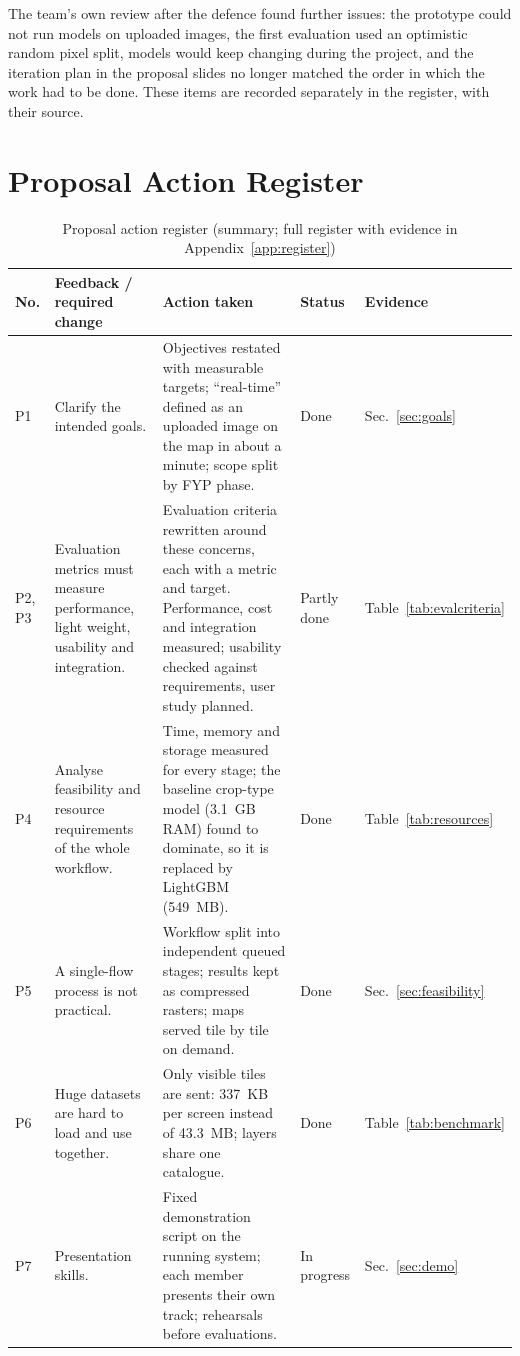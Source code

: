 The team's own review after the defence found further issues: the prototype could not run models on
uploaded images, the first evaluation used an optimistic random pixel split, models would keep
changing during the project, and the iteration plan in the proposal slides no longer matched the
order in which the work had to be done. These items are recorded separately in the register, with
their source.

\section{Proposal Action Register}
\begin{table}[htbp]
\centering\small
\caption{Proposal action register (summary; full register with evidence in Appendix~\ref{app:register})}
\label{tab:register}
\begin{tabularx}{\textwidth}{L{0.8cm} L{3.6cm} Y L{1.3cm} L{1.7cm}}
\toprule
\textbf{No.} & \textbf{Feedback / required change} & \textbf{Action taken} & \textbf{Status} & \textbf{Evidence}\\
\midrule
P1 & Clarify the intended goals. & Objectives restated with measurable targets; ``real-time'' defined as an uploaded image on the map in about a minute; scope split by FYP phase. & Done & Sec.~\ref{sec:goals}\\
P2, P3 & Evaluation metrics must measure performance, light weight, usability and integration. & Evaluation criteria rewritten around these concerns, each with a metric and target. Performance, cost and integration measured; usability checked against requirements, user study planned. & Partly done & Table~\ref{tab:evalcriteria}\\
P4 & Analyse feasibility and resource requirements of the whole workflow. & Time, memory and storage measured for every stage; the baseline crop-type model (3.1~GB RAM) found to dominate, so it is replaced by LightGBM (549~MB). & Done & Table~\ref{tab:resources}\\
P5 & A single-flow process is not practical. & Workflow split into independent queued stages; results kept as compressed rasters; maps served tile by tile on demand. & Done & Sec.~\ref{sec:feasibility}\\
P6 & Huge datasets are hard to load and use together. & Only visible tiles are sent: 337~KB per screen instead of 43.3~MB; layers share one catalogue. & Done & Table~\ref{tab:benchmark}\\
P7 & Presentation skills. & Fixed demonstration script on the running system; each member presents their own track; rehearsals before evaluations. & In progress & Sec.~\ref{sec:demo}\\

\end{tabularx}
\end{table}
